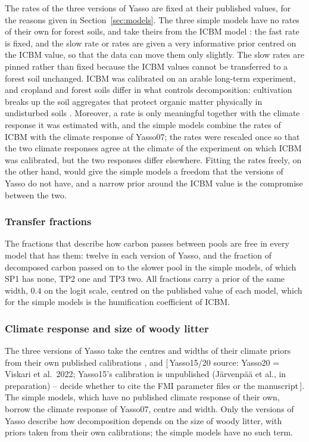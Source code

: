 \documentclass[11pt]{article}
\newcommand{\gap}[1]{\textcolor{red!70!black}{\small[\,#1\,]}}
\begin{document}
The rates of the three versions of Yasso are fixed at their published values, for the
reasons given in Section~\ref{sec:models}. The three simple models have no rates of
their own for forest soils, and take theirs from the ICBM model
\citep{AndrenKatterer1997}: the fast rate is fixed, and the slow rate or rates are
given a very informative prior centred on the ICBM value, so that the data can move
them only slightly. The slow rates are pinned rather than fixed because the ICBM values
cannot be transferred to a forest soil unchanged. ICBM was calibrated on an arable
long-term experiment, and cropland and forest soils differ in what controls
decomposition: cultivation breaks up the soil aggregates that protect organic matter
physically in undisturbed soils \citep{Six2002}. Moreover, a rate is only meaningful
together with the climate response it was estimated with, and the simple models combine
the rates of ICBM with the climate response of Yasso07; the rates were rescaled once so
that the two climate responses agree at the climate of the experiment on which ICBM was
calibrated, but the two responses differ elsewhere. Fitting the rates freely, on the
other hand, would give the simple models a freedom that the versions of Yasso do not
have, and a narrow prior around the ICBM value is the compromise between the two.

\subsubsection{Transfer fractions}

The fractions that describe how carbon passes between pools are free in every model
that has them: twelve in each version of Yasso, and the fraction of decomposed carbon
passed on to the slower pool in the simple models, of which SP1 has none, TP2 one and
TP3 two. All fractions carry a prior of the same width, $0.4$ on the logit scale,
centred on the published value of each model, which for the simple models is the
humification coefficient of ICBM.

\subsubsection{Climate response and size of woody litter}

The three versions of Yasso take the centres and widths of their climate priors from
their own published calibrations \citep{Tuomi2009,Tuomi2011woody}, and \gap{Yasso15/20
source: Yasso20 = Viskari et al.\ 2022; Yasso15's calibration is unpublished (Järvenpää et
al., in preparation) -- decide whether to cite the FMI parameter files or the manuscript}.
The simple models, which have no published climate response of their own, borrow the
climate response of Yasso07, centre and width. Only the versions of Yasso describe how
decomposition depends on the size of woody litter, with priors taken from their own
calibrations; the simple models have no such term.
\end{document}

